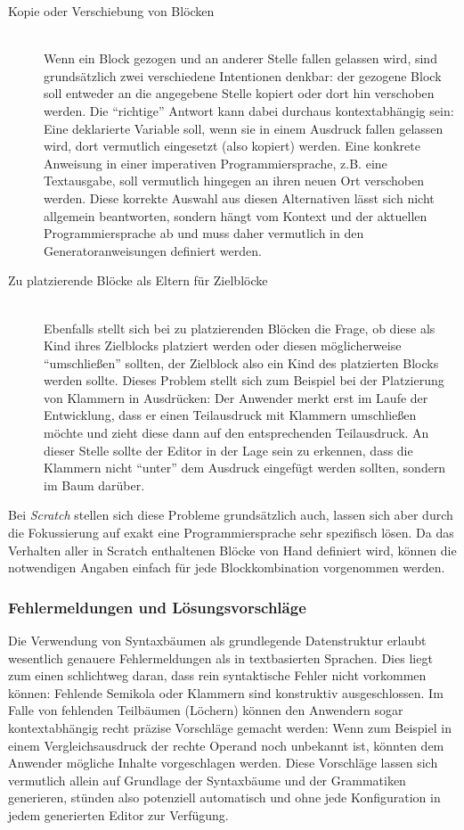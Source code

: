 \documentclass[paper=a4,fontsize=11pt,parskip=half]{scrartcl}
\begin{document}
\begin{description}
\item[Kopie oder Verschiebung von Blöcken] \hfill\\
  Wenn ein Block gezogen und an anderer Stelle fallen gelassen wird, sind grundsätzlich zwei verschiedene Intentionen denkbar: der gezogene Block soll entweder an die angegebene Stelle kopiert oder dort hin verschoben werden. Die \enquote{richtige} Antwort kann dabei durchaus kontextabhängig sein: Eine deklarierte Variable soll, wenn sie in einem Ausdruck fallen gelassen wird, dort vermutlich eingesetzt (also kopiert) werden. Eine konkrete Anweisung in einer imperativen Programmiersprache, z.B. eine Textausgabe, soll vermutlich hingegen an ihren neuen Ort verschoben werden. Diese korrekte Auswahl aus diesen Alternativen lässt sich nicht allgemein beantworten, sondern hängt vom Kontext und der aktuellen Programmiersprache ab und muss daher vermutlich in den Generatoranweisungen definiert werden.
\item[Zu platzierende Blöcke als Eltern für Zielblöcke] \hfill\\
  Ebenfalls stellt sich bei zu platzierenden Blöcken die Frage, ob diese als Kind ihres Zielblocks platziert werden oder diesen möglicherweise \enquote{umschließen} sollten, der Zielblock also ein Kind des platzierten Blocks werden sollte. Dieses Problem stellt sich zum Beispiel bei der Platzierung von Klammern in Ausdrücken: Der Anwender merkt erst im Laufe der Entwicklung, dass er einen Teilausdruck mit Klammern umschließen möchte und zieht diese dann auf den entsprechenden Teilausdruck. An dieser Stelle sollte der Editor in der Lage sein zu erkennen, dass die Klammern nicht \enquote{unter} dem Ausdruck eingefügt werden sollten, sondern im Baum darüber.
\end{description}

Bei \textit{Scratch} stellen sich diese Probleme grundsätzlich auch, lassen sich aber durch die Fokussierung auf exakt eine Programmiersprache sehr spezifisch lösen. Da das Verhalten aller in Scratch enthaltenen Blöcke von Hand definiert wird, können die notwendigen Angaben einfach für jede Blockkombination vorgenommen werden.

\subsubsection{Fehlermeldungen und Lösungsvorschläge}

Die Verwendung von Syntaxbäumen als grundlegende Datenstruktur erlaubt wesentlich genauere Fehlermeldungen als in textbasierten Sprachen. Dies liegt zum einen schlichtweg daran, dass rein syntaktische Fehler nicht vorkommen können: Fehlende Semikola oder Klammern sind konstruktiv ausgeschlossen. Im Falle von fehlenden Teilbäumen (Löchern) können den Anwendern sogar kontextabhängig recht präzise Vorschläge gemacht werden: Wenn zum Beispiel in einem Vergleichsausdruck der rechte Operand noch unbekannt ist, könnten dem Anwender mögliche Inhalte vorgeschlagen werden. Diese Vorschläge lassen sich vermutlich allein auf Grundlage der Syntaxbäume und der Grammatiken generieren, stünden also potenziell automatisch und ohne jede Konfiguration in jedem generierten Editor zur Verfügung.
\end{document}

